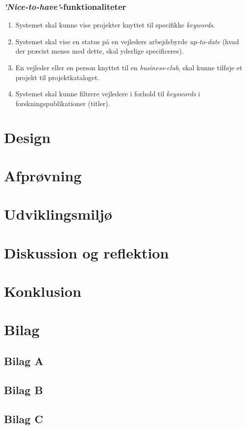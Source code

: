 \documentclass[12pt]{article}
\begin{document}
\subsubsection{\textit{'Nice-to-have'}-funktionaliteter}
\begin{enumerate}
  \item Systemet skal kunne vise projekter knyttet til specifikke \textit{keywords}.

  \item Systemet skal vise en status på en vejleders arbejdsbyrde \textit{up-to-date} (hvad der præcist menes med dette, skal yderlige specificeres).
  \item En vejleder eller en person knyttet til en \textit{business-club}, skal kunne tilføje et projekt til projektkataloget.

	\item Systemet skal kunne filtrere vejledere i forhold til \textit{keyswords} i forskningspublikationer (titler).
\end{enumerate}




\section{Design}
\label{sec:design}

\section{Afprøvning}
\label{sec:afproevning}

\section{Udviklingsmiljø}
\label{sec:udvikling}

\section{Diskussion og reflektion}
\label{sec:diskussion}

\section{Konklusion}
\label{sec:konklusion}

\section{Bilag}
\label{sec:bilag}

\subsection{Bilag A}
\label{sec:bilagA}

\subsection{Bilag B}
\label{sec:bilagB}

\subsection{Bilag C}
\label{sec:bilagC}
\end{document}
